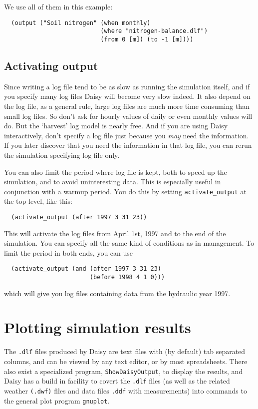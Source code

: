 \documentclass[a4paper]{article}
\begin{document}
We use all of them in this example:
\begin{verbatim}
  (output ("Soil nitrogen" (when monthly)
                           (where "nitrogen-balance.dlf")
                           (from 0 [m]) (to -1 [m])))
\end{verbatim}

\subsection{Activating output}
\label{sec:actout}

Since writing a log file tend to be as slow as running the
simulation itself, and if you specify many log files Daisy will
become very slow indeed.  It also depend on the log file, as a general
rule, large log files are much more time consuming than small log
files.  So don't ask for hourly values of daily or even monthly values
will do.  But the `harvest' log model is nearly free.  And if you are
using Daisy interactively, don't specify a log file just because
you \emph{may} need the information.  If you later discover that you
need the information in that log file, you can rerun the simulation
specifying log file only.

You can also limit the period where log file is kept, both to speed up
the simulation, and to avoid uninteresting data.  This is
especially useful in conjunction with a warmup period.  You do this by
setting \texttt{activate\_output} at the top level, like this:
\begin{verbatim}
  (activate_output (after 1997 3 31 23))
\end{verbatim}
This will activate the log files from April 1st, 1997 and to the end
of the simulation.  You can specify all the same kind of conditions as
in management.  To limit the period in both ends, you can use
\begin{verbatim}
  (activate_output (and (after 1997 3 31 23) 
                        (before 1998 4 1 0)))
\end{verbatim}
which will give you log files containing data from the hydraulic year
1997. 

\section{Plotting simulation results}
\label{sec:plot}

The \texttt{.dlf} files produced by Daisy are text files with (by
default) tab separated columns, and can be viewed by any text editor,
or by most spreadsheets.  There also exist a specialized program,
\texttt{ShowDaisyOutput}, to display the results, and Daisy has a
build in facility to covert the \texttt{.dlf} files (as well as the
related weather \texttt{(.dwf)} files and data files \texttt{.ddf}
with measurements) into commands to the general plot program
\texttt{gnuplot}. 
\end{document}
